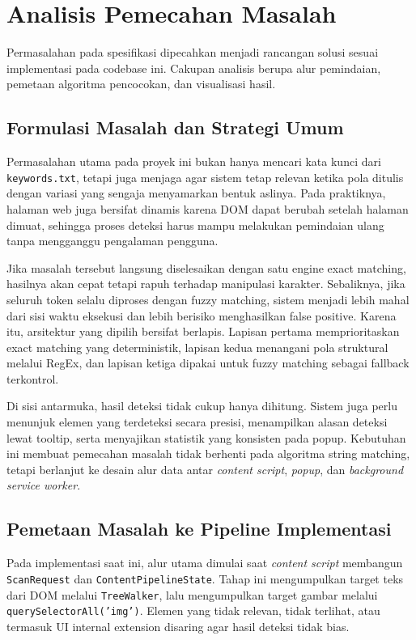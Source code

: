 \section{Analisis Pemecahan Masalah}

Permasalahan pada spesifikasi dipecahkan menjadi rancangan solusi sesuai implementasi pada codebase ini. Cakupan analisis berupa alur pemindaian, pemetaan algoritma pencocokan, dan visualisasi hasil.

\subsection{Formulasi Masalah dan Strategi Umum}

Permasalahan utama pada proyek ini bukan hanya mencari kata kunci dari \texttt{keywords.txt}, tetapi juga menjaga agar sistem tetap relevan ketika pola ditulis dengan variasi yang sengaja menyamarkan bentuk aslinya. Pada praktiknya, halaman web juga bersifat dinamis karena DOM dapat berubah setelah halaman dimuat, sehingga proses deteksi harus mampu melakukan pemindaian ulang tanpa mengganggu pengalaman pengguna.

Jika masalah tersebut langsung diselesaikan dengan satu engine exact matching, hasilnya akan cepat tetapi rapuh terhadap manipulasi karakter. Sebaliknya, jika seluruh token selalu diproses dengan fuzzy matching, sistem menjadi lebih mahal dari sisi waktu eksekusi dan lebih berisiko menghasilkan false positive. Karena itu, arsitektur yang dipilih bersifat berlapis. Lapisan pertama memprioritaskan exact matching yang deterministik, lapisan kedua menangani pola struktural melalui RegEx, dan lapisan ketiga dipakai untuk fuzzy matching sebagai fallback terkontrol.

Di sisi antarmuka, hasil deteksi tidak cukup hanya dihitung. Sistem juga perlu menunjuk elemen yang terdeteksi secara presisi, menampilkan alasan deteksi lewat tooltip, serta menyajikan statistik yang konsisten pada popup. Kebutuhan ini membuat pemecahan masalah tidak berhenti pada algoritma string matching, tetapi berlanjut ke desain alur data antar \textit{content script}, \textit{popup}, dan \textit{background service worker}.

\subsection{Pemetaan Masalah ke Pipeline Implementasi}

Pada implementasi saat ini, alur utama dimulai saat \textit{content script} membangun \texttt{ScanRequest} dan \texttt{ContentPipelineState}. Tahap ini mengumpulkan target teks dari DOM melalui \texttt{TreeWalker}, lalu mengumpulkan target gambar melalui \texttt{querySelectorAll('img')}. Elemen yang tidak relevan, tidak terlihat, atau termasuk UI internal extension disaring agar hasil deteksi tidak bias.

